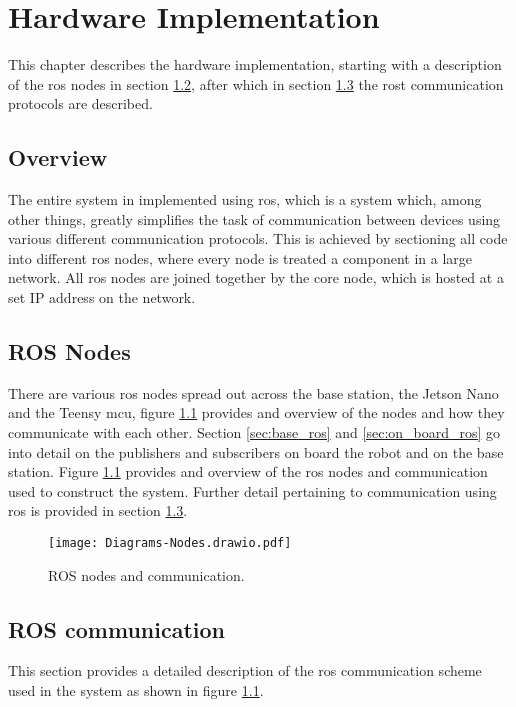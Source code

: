 \chapter{Hardware Implementation} \label{chap:hardware}
This chapter describes the hardware implementation, starting with a description of the \ac{ros} nodes in section \ref{sec:ros_nodes},
after which in section \ref{sec:ros_comms} the rost communication protocols are described.

\section{Overview}
The entire system in implemented using \ac{ros}, which is a system which, among other things, greatly simplifies the task of
communication between devices using various different communication protocols. This is achieved by sectioning all code into different
\ac{ros} nodes, where every node is treated a component in a large network. All ros nodes are joined together by the core node,
which is hosted at a set IP address on the network.

\section{ROS Nodes} \label{sec:ros_nodes}
There are various ros nodes spread out across the base station, the Jetson Nano and the Teensy \ac{mcu}, figure \ref{fig:nodes} provides and overview
of the nodes and how they communicate with each other. Section \ref{sec:base_ros} and \ref{sec:on_board_ros} go into detail on the publishers and subscribers
on board the robot and on the base station. Figure \ref{fig:nodes} provides and overview of the \ac{ros} nodes and communication used to construct the system.
Further detail pertaining to communication using \ac{ros} is provided in section \ref{sec:ros_comms}.

\begin{figure}[h]
    \centering
    \texttt{[image: Diagrams-Nodes.drawio.pdf]}
    \caption{ROS nodes and communication.}
    \label{fig:nodes}
\end{figure}

\newpage
\section{ROS communication} \label{sec:ros_comms}
    This section provides a detailed description of the \ac{ros} communication scheme used in the system as shown in figure \ref{fig:nodes}.

